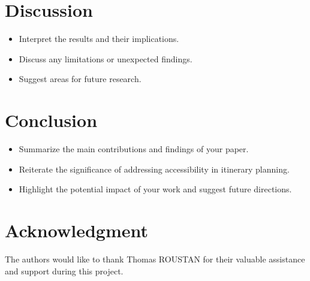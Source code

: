 \documentclass[conference]{IEEEtran}
\begin{document}
    \section{Discussion}\label{sec:discussion}

    \begin{itemize}
        \item Interpret the results and their implications.
        \item Discuss any limitations or unexpected findings.
        \item Suggest areas for future research.
    \end{itemize}


    \section{Conclusion}\label{sec:conclusion}

    \begin{itemize}
        \item Summarize the main contributions and findings of your paper.
        \item Reiterate the significance of addressing accessibility in itinerary planning.
        \item Highlight the potential impact of your work and suggest future directions.
    \end{itemize}

    \section*{Acknowledgment}
    The authors would like to thank Thomas ROUSTAN for their valuable assistance and support during this project.

    
    
\end{document}
